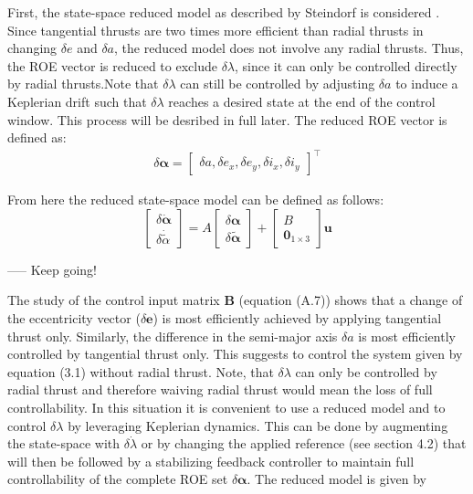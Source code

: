 First, the state-space reduced model as described by Steindorf is considered \cite{steindorf2017constrained}. Since tangential thrusts are two times more efficient than radial thrusts in changing $\delta e$ and $\delta a$, the reduced model does not involve any radial thrusts. Thus, the ROE vector is reduced to exclude $\delta \lambda$, since it can only be controlled directly by radial thrusts.Note that $\delta \lambda$ can still be controlled by adjusting $\delta a$ to induce a Keplerian drift such that $\delta \lambda$ reaches a desired state at the end of the control window. This process will be desribed in full later. The reduced ROE vector is defined as: 
\begin{align*}
\delta \bm{\alpha} = \begin{bmatrix} \delta a, \delta e_x, \delta e_y, \delta i_x, \delta i_y \end{bmatrix}^\top
\end{align*}

From here the reduced state-space model can be defined as follows:
\begin{equation}
\begin{bmatrix}
\delta \dot{\bm{\alpha}} \\
\delta \dot{\tilde{\alpha}}
\end{bmatrix}
=
A
\begin{bmatrix}
\delta \bm{\alpha} \\
\delta \tilde{\bm{\alpha}}
\end{bmatrix}
+
\begin{bmatrix}
B \\
\bm{0}_{1 \times 3}
\end{bmatrix}
\bm{u}
\end{equation}



----- Keep going!


The study of the control input matrix $\bm{B}$ (equation (A.7)) shows that a change of the eccentricity vector ($\delta \bm{e}$) is most efficiently achieved by applying tangential thrust only. Similarly, the difference in the semi-major axis $\delta a$ is most efficiently controlled by tangential thrust only. This suggests to control the system given by equation (3.1) without radial thrust. Note, that $\delta \lambda$ can only be controlled by radial thrust and therefore waiving radial thrust would mean the loss of full controllability. In this situation it is convenient to use a reduced model and to control $\delta \lambda$ by leveraging Keplerian dynamics. This can be done by augmenting the state-space with $\delta \dot{\lambda}$ \cite{ref8} or by changing the applied reference (see section 4.2) that will then be followed by a stabilizing feedback controller to maintain full controllability of the complete ROE set $\delta \bm{\alpha}$. The reduced model is given by



